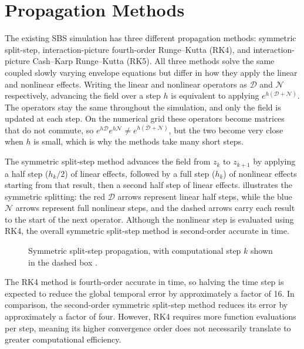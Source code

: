 \section{Propagation Methods}

The existing SBS simulation has three different propagation methods: symmetric split-step, interaction-picture fourth-order Runge--Kutta (RK4), 
and interaction-picture Cash--Karp Runge--Kutta (RK5). All three methods solve the same coupled slowly varying envelope equations but differ 
in how they apply the linear and nonlinear effects.
Writing the linear and nonlinear operators as $\mathcal{D}$ and $\mathcal{N}$ respectively, advancing the field over a step $h$ is equivalent to
applying $e^{h(\mathcal{D}+\mathcal{N})}$. The operators stay the same throughout the simulation, and only the field is updated at each step. On the numerical grid these operators become matrices that do not commute, so
$e^{h\mathcal{D}}e^{h\mathcal{N}} \neq e^{h(\mathcal{D}+\mathcal{N})}$, but the two become very close when $h$ is small, which is why the
methods take many short steps.

The symmetric split-step method advances the field from $z_k$ to $z_{k+1}$ by applying a half step ($h_k/2$) 
of linear effects, followed by a full step ($h_k$) of nonlinear effects starting from that result, 
then a second half step of linear effects.  illustrates the symmetric splitting: 
the red $\mathcal{D}$ arrows represent linear half steps, while the blue $\mathcal{N}$ arrows represent full nonlinear steps, 
and the dashed arrows carry each result to the start of the next operator.
Although the nonlinear step is evaluated using RK4, the overall symmetric split-step method is second-order accurate in time.

\begin{figure}
  \centering
  \caption[Symmetric split-step propagation]{Symmetric split-step propagation, with computational step $k$ shown in the dashed box \parencite{balacMathematicalAnalysisAdaptive2014}.}
  \label{fig:symmetric-split-step}
\end{figure}

The RK4 method is fourth-order accurate in time, so halving the time step is expected to reduce the global temporal error by approximately 
a factor of 16. In comparison, the second-order symmetric split-step method reduces its error by approximately a factor of four. 
However, RK4 requires more function evaluations per step, meaning its higher convergence order does not necessarily translate to greater 
computational efficiency.

